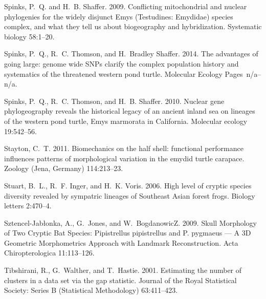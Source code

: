 \documentclass[12pt,letterpaper]{article}
\begin{document}
\begin{thebibliography}{77}
        Spinks, P.~Q. and H.~B. Shaffer. 2009. {Conflicting mitochondrial and nuclear
          phylogenies for the widely disjunct Emys (Testudines: Emydidae) species
        complex, and what they tell us about biogeography and hybridization.}
        Systematic biology 58:1--20.

        Spinks, P.~Q., R.~C. Thomson, and H.~{Bradley Shaffer}. 2014. {The advantages
          of going large: genome wide SNPs clarify the complex population history and
        systematics of the threatened western pond turtle}. Molecular Ecology
        Pages~n/a--n/a.

        Spinks, P.~Q., R.~C. Thomson, and H.~B. Shaffer. 2010. {Nuclear gene
          phylogeography reveals the historical legacy of an ancient inland sea on
        lineages of the western pond turtle, Emys marmorata in California.} Molecular
        ecology 19:542--56.

        Stayton, C.~T. 2011. {Biomechanics on the half shell: functional performance
          influences patterns of morphological variation in the emydid turtle
        carapace.} Zoology (Jena, Germany) 114:213--23.

        Stuart, B.~L., R.~F. Inger, and H.~K. Voris. 2006. {High level of cryptic
          species diversity revealed by sympatric lineages of Southeast Asian forest
        frogs.} Biology letters 2:470--4.

        Sztencel-Jabłonka, A., G.~Jones, and W.~BogdanowicZ. 2009. {Skull Morphology
          of Two Cryptic Bat Species: Pipistrellus pipistrellus and P. pygmaeus — A
        3D Geometric Morphometrics Approach with Landmark Reconstruction}. Acta
        Chiropterologica 11:113--126.

        Tibshirani, R., G.~Walther, and T.~Hastie. 2001. {Estimating the number of
        clusters in a data set via the gap statistic}. Journal of the Royal
        Statistical Society: Series B (Statistical Methodology) 63:411--423.


\end{thebibliography}
\end{document}
